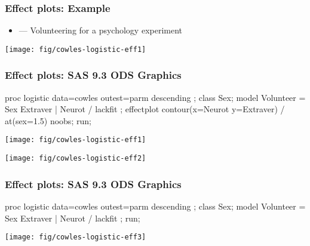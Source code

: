 \begin{frame}
  \frametitle{Effect plots: Example}
  \begin{itemize}
	\item \citet{CowlesDavis:87}--- Volunteering for a psychology experiment
  \end{itemize}

 \begin{center}
  \texttt{[image: fig/cowles-logistic-eff1]}
 \end{center}
\end{frame}

\begin{frame}[fragile]
  \frametitle{Effect plots: SAS 9.3 ODS Graphics}
\vspace{1ex}
\begin{Input}[fontsize=\footnotesize,label=\fbox{\texttt{cowles-logistic-eff.sas}},baselinestretch=0.8]
proc logistic data=cowles outest=parm  descending ;
    class Sex;
    model Volunteer = Sex   Extraver | Neurot / lackfit ;
    effectplot contour(x=Neurot y=Extraver) / at(sex=1.5) noobs;
    run;
\end{Input}
 \begin{minipage}[b]{.5\linewidth}
  \centering
  \texttt{[image: fig/cowles-logistic-eff1]}
 \end{minipage}%
 \begin{minipage}[b]{.5\linewidth}
  \centering
  \texttt{[image: fig/cowles-logistic-eff2]}
 \end{minipage}
\end{frame}

\begin{frame}[fragile]
  \frametitle{Effect plots: SAS 9.3 ODS Graphics}
\vspace{1ex}
\begin{Input}[fontsize=\footnotesize,label=\fbox{\texttt{cowles-logistic-eff.sas}},baselinestretch=0.8]
proc logistic data=cowles outest=parm  descending ;
    class Sex;
    model Volunteer = Sex   Extraver | Neurot / lackfit ;
    run;
\end{Input}
 \begin{center}
  \texttt{[image: fig/cowles-logistic-eff3]}
 \end{center}
\end{frame}

